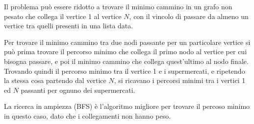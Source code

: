 

Il problema può essere ridotto a trovare il minimo cammino in un grafo non pesato che collega il vertice 1 al vertice $N$, con il vincolo di passare da almeno un vertice tra quelli presenti in una lista data.

Per trovare il minimo cammino tra due nodi passante per un particolare vertice si può prima trovare il percorso minimo che collega il primo nodo al vertice per cui bisogna passare, e poi il minimo cammino che collega quest'ultimo al nodo finale.
Trovando quindi il percorso minimo tra il vertice 1 e i supermercati, e ripetendo la stessa cosa partendo dal vertice $N$, si ricavano i percorsi minimi tra i vertici 1 ed $N$ passanti per ognuno dei supermercati.

La ricerca in ampiezza (BFS) è l'algoritmo migliore per trovare il percoso minimo in questo caso, dato che i collegamenti non hanno peso. 


\Codice
\colorbox{white}{}
